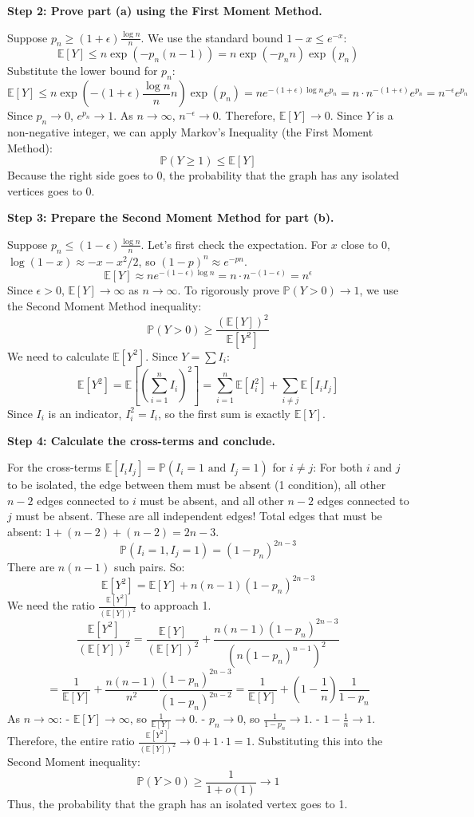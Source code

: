 \begin{solution}
\textbf{Step 2: Prove part (a) using the First Moment Method.}

Suppose $p_n \geq (1+\epsilon)\frac{\log n}{n}$. We use the standard bound $1-x \leq e^{-x}$:
\[ \mathbb{E}[Y] \leq n \exp(-p_n(n-1)) = n \exp(-p_n n) \exp(p_n) \]
Substitute the lower bound for $p_n$:
\[ \mathbb{E}[Y] \leq n \exp\left(-(1+\epsilon)\frac{\log n}{n} n\right) \exp(p_n) = n e^{-(1+\epsilon)\log n} e^{p_n} = n \cdot n^{-(1+\epsilon)} e^{p_n} = n^{-\epsilon} e^{p_n} \]
Since $p_n \to 0$, $e^{p_n} \to 1$. As $n \to \infty$, $n^{-\epsilon} \to 0$. Therefore, $\mathbb{E}[Y] \to 0$.
Since $Y$ is a non-negative integer, we can apply Markov's Inequality (the First Moment Method):
\[ \mathbb{P}(Y \geq 1) \leq \mathbb{E}[Y] \]
Because the right side goes to 0, the probability that the graph has any isolated vertices goes to 0.

\textbf{Step 3: Prepare the Second Moment Method for part (b).}

Suppose $p_n \leq (1-\epsilon)\frac{\log n}{n}$.
Let's first check the expectation. For $x$ close to 0, $\log(1-x) \approx -x - x^2/2$, so $(1-p)^n \approx e^{-pn}$.
\[ \mathbb{E}[Y] \approx n e^{-(1-\epsilon)\log n} = n \cdot n^{-(1-\epsilon)} = n^\epsilon \]
Since $\epsilon > 0$, $\mathbb{E}[Y] \to \infty$ as $n \to \infty$.
To rigorously prove $\mathbb{P}(Y > 0) \to 1$, we use the Second Moment Method inequality:
\[ \mathbb{P}(Y > 0) \geq \frac{(\mathbb{E}[Y])^2}{\mathbb{E}[Y^2]} \]
We need to calculate $\mathbb{E}[Y^2]$. Since $Y = \sum I_i$:
\[ \mathbb{E}[Y^2] = \mathbb{E}\left[ \left(\sum_{i=1}^n I_i\right)^2 \right] = \sum_{i=1}^n \mathbb{E}[I_i^2] + \sum_{i \neq j} \mathbb{E}[I_i I_j] \]
Since $I_i$ is an indicator, $I_i^2 = I_i$, so the first sum is exactly $\mathbb{E}[Y]$.

\textbf{Step 4: Calculate the cross-terms and conclude.}

For the cross-terms $\mathbb{E}[I_i I_j] = \mathbb{P}(I_i = 1 \text{ and } I_j = 1)$ for $i \neq j$:
For both $i$ and $j$ to be isolated, the edge between them must be absent (1 condition), all other $n-2$ edges connected to $i$ must be absent, and all other $n-2$ edges connected to $j$ must be absent. These are all independent edges!
Total edges that must be absent: $1 + (n-2) + (n-2) = 2n-3$.
\[ \mathbb{P}(I_i = 1, I_j = 1) = (1-p_n)^{2n-3} \]
There are $n(n-1)$ such pairs. So:
\[ \mathbb{E}[Y^2] = \mathbb{E}[Y] + n(n-1)(1-p_n)^{2n-3} \]
We need the ratio $\frac{\mathbb{E}[Y^2]}{(\mathbb{E}[Y])^2}$ to approach 1.
\[ \frac{\mathbb{E}[Y^2]}{(\mathbb{E}[Y])^2} = \frac{\mathbb{E}[Y]}{(\mathbb{E}[Y])^2} + \frac{n(n-1)(1-p_n)^{2n-3}}{\left(n(1-p_n)^{n-1}\right)^2} \]
\[ = \frac{1}{\mathbb{E}[Y]} + \frac{n(n-1)}{n^2} \frac{(1-p_n)^{2n-3}}{(1-p_n)^{2n-2}} = \frac{1}{\mathbb{E}[Y]} + \left(1 - \frac{1}{n}\right) \frac{1}{1-p_n} \]
As $n \to \infty$:
- $\mathbb{E}[Y] \to \infty$, so $\frac{1}{\mathbb{E}[Y]} \to 0$.
- $p_n \to 0$, so $\frac{1}{1-p_n} \to 1$.
- $1 - \frac{1}{n} \to 1$.
Therefore, the entire ratio $\frac{\mathbb{E}[Y^2]}{(\mathbb{E}[Y])^2} \to 0 + 1 \cdot 1 = 1$.
Substituting this into the Second Moment inequality:
\[ \mathbb{P}(Y > 0) \geq \frac{1}{1 + o(1)} \to 1 \]
Thus, the probability that the graph has an isolated vertex goes to 1.
\end{solution}

